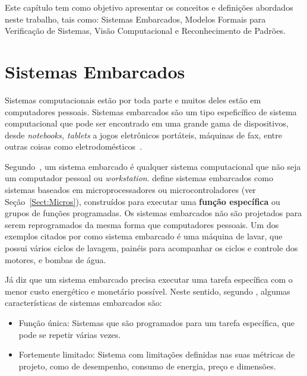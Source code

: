 
\label{chap:fund_teo}
Este capítulo tem como objetivo apresentar os conceitos e definições abordados neste trabalho, tais como: Sistemas Embarcados, Modelos Formais para Verificação de Sistemas, Visão Computacional e Reconhecimento de Padrões.
  
    
    
\section{Sistemas Embarcados} 

Sistemas computacionais estão por toda parte e muitos deles estão em computadores pessoais. Sistemas embarcados são um tipo espeficífico de sistema computacional que pode ser encontrado em uma grande gama de dispositivos, desde \textit{notebooks, tablets} a jogos eletrônicos portáteis, máquinas de fax, entre outras coisas como eletrodomésticos~\cite{vahid:2002}.

Segundo~, um sistema embarcado é qualquer sistema computacional que não seja um computador pessoal ou \textit{workstation}.  define sistemas embarcados como sistemas baseados em microprocessadores ou microcontroladores (ver Seção~\ref{Sect:Micros}), construídos para executar uma \textbf{função específica} ou grupos de funções programadas. Os sistemas embarcados não são projetados para serem reprogramados da mesma forma que computadores pessoais.
% 
Um dos exemplos citados por \cite{heath:2002} como sistema embarcado é uma máquina de lavar, que possui vários ciclos de lavagem, painéis para acompanhar os ciclos e controle dos motores, e bombas de água.


Já  diz que um sistema embarcado precisa executar uma tarefa específica com o menor custo energético e monetário possível.
Neste sentido, segundo , algumas características de sistemas embarcados são:\begin{itemize}
\item Função única: Sistemas que são programados para um tarefa específica, que pode se repetir várias vezes.
\item Fortemente limitado: Sistema com limitações definidas nas suas métricas de projeto, como de desempenho, consumo de energia, preço e dimensões.
\end{itemize}


 

